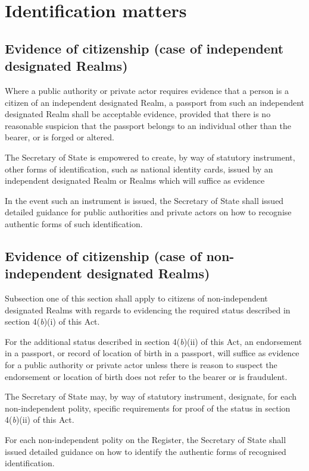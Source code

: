 \documentclass{ukbill}
\begin{document}
\chapter{Identification matters}
\section{Evidence of citizenship (case of independent designated Realms)}
\begin{numstat}
\item Where a public authority or private actor requires evidence that a person is a citizen of an independent designated Realm, a passport from such an independent designated Realm shall be acceptable evidence, provided that there is no reasonable suspicion that the passport belongs to an individual other than the bearer, or is forged or altered.
\begin{alphstat}
\item The Secretary of State is empowered to create, by way of statutory instrument, other forms of identification, such as national identity cards, issued by an independent designated Realm or Realms which will suffice as evidence
\begin{romstat}
	\item In the event such an instrument is issued, the Secretary of State shall issued detailed guidance for public authorities and private actors on how to recognise authentic forms of such identification.
\end{romstat} 
\end{alphstat}
\end{numstat}

\section{Evidence of citizenship (case of non-independent designated Realms)}
\begin{numstat}
\item 	Subsection one of this section shall apply to citizens of non-independent designated Realms with regards to evidencing the required status described in section 4(\textit{b})(i) of this Act. 
\item For the additional status described in section 4(\textit{b})(ii) of this Act, an endorsement in a passport,  or record of location of birth in a passport, will  suffice as evidence for  a public authority or private actor unless there is reason to suspect the endorsement or location of birth does not refer to the bearer or is fraudulent.
\item The Secretary of State may, by way of statutory instrument, designate, for each non-independent polity, specific requirements for proof of the status in section 4(\textit{b})(ii) of this Act.
\item For each  non-independent polity on the Register, the Secretary of State shall issued detailed guidance on how to identify the authentic forms of recognised identification.
\end{numstat}
\end{document}

